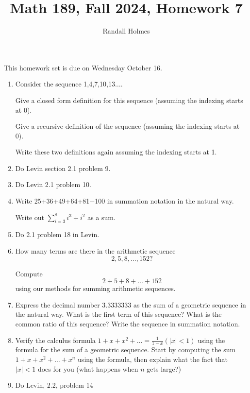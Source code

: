 \documentclass[12pt]{article}
\title{Math 189, Fall 2024, Homework 7}
\author{Randall Holmes}
\begin{document}
This homework set is due on Wednesday October 16.

\begin{enumerate}

\item   Consider the sequence 1,4,7,10,13$\ldots$.

Give a closed form definition for this sequence (assuming the indexing starts at 0).

Give a recursive definition of the sequence (assuming the indexing starts at 0).

Write these two definitions again assuming the indexing starts at 1.

\item   Do Levin section 2.1 problem 9. 

\item   Do Levin 2.1 problem 10.

\item  Write 25+36+49+64+81+100 in summation notation in the natural way.

Write out $\sum_{i=3}^8 i^3+i^2$ as a sum.

\item  Do 2.1 problem 18 in Levin.


\item  How many terms are there in the arithmetic sequence $$2,5,8,\ldots,152?$$

Compute  $$2+5+8+\ldots+152$$ using our methods for summing arithmetic sequences.


\item  Express the decimal number 3.3333333 as the sum of a geometric sequence in the natural way.  What is the first term of this sequence?  What is the common ratio of this sequence?  Write the sequence in summation notation.


\item  Verify the calculus formula $1+x+x^2+\ldots = \frac{1}{1-x} (|x|<1)$ using the formula for the sum of a geometric sequence.  Start by computing the sum
$1+x+x^2+\ldots+x^n$ using the formula, then explain what the fact that $|x|<1$ does for you (what happens when $n$ gets large?)


\item  Do Levin, 2.2, problem 14


\end{enumerate}
\end{document}
